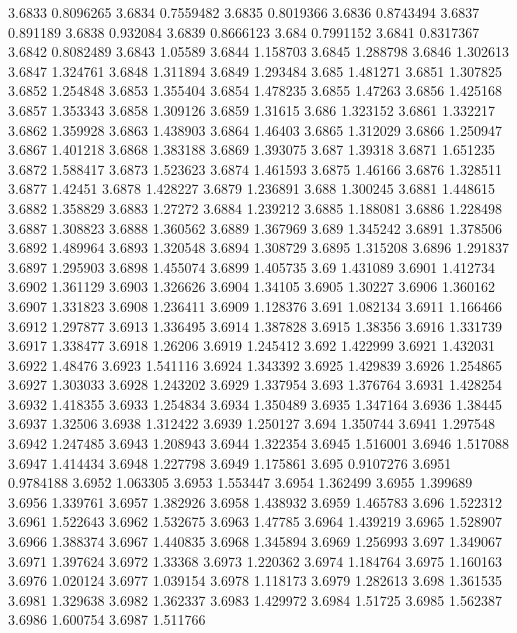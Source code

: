 3.6833  0.8096265
3.6834  0.7559482
3.6835  0.8019366
3.6836  0.8743494
3.6837  0.891189
3.6838  0.932084
3.6839  0.8666123
3.684  0.7991152
3.6841  0.8317367
3.6842  0.8082489
3.6843  1.05589
3.6844  1.158703
3.6845  1.288798
3.6846  1.302613
3.6847  1.324761
3.6848  1.311894
3.6849  1.293484
3.685  1.481271
3.6851  1.307825
3.6852  1.254848
3.6853  1.355404
3.6854  1.478235
3.6855  1.47263
3.6856  1.425168
3.6857  1.353343
3.6858  1.309126
3.6859  1.31615
3.686  1.323152
3.6861  1.332217
3.6862  1.359928
3.6863  1.438903
3.6864  1.46403
3.6865  1.312029
3.6866  1.250947
3.6867  1.401218
3.6868  1.383188
3.6869  1.393075
3.687  1.39318
3.6871  1.651235
3.6872  1.588417
3.6873  1.523623
3.6874  1.461593
3.6875  1.46166
3.6876  1.328511
3.6877  1.42451
3.6878  1.428227
3.6879  1.236891
3.688  1.300245
3.6881  1.448615
3.6882  1.358829
3.6883  1.27272
3.6884  1.239212
3.6885  1.188081
3.6886  1.228498
3.6887  1.308823
3.6888  1.360562
3.6889  1.367969
3.689  1.345242
3.6891  1.378506
3.6892  1.489964
3.6893  1.320548
3.6894  1.308729
3.6895  1.315208
3.6896  1.291837
3.6897  1.295903
3.6898  1.455074
3.6899  1.405735
3.69  1.431089
3.6901  1.412734
3.6902  1.361129
3.6903  1.326626
3.6904  1.34105
3.6905  1.30227
3.6906  1.360162
3.6907  1.331823
3.6908  1.236411
3.6909  1.128376
3.691  1.082134
3.6911  1.166466
3.6912  1.297877
3.6913  1.336495
3.6914  1.387828
3.6915  1.38356
3.6916  1.331739
3.6917  1.338477
3.6918  1.26206
3.6919  1.245412
3.692  1.422999
3.6921  1.432031
3.6922  1.48476
3.6923  1.541116
3.6924  1.343392
3.6925  1.429839
3.6926  1.254865
3.6927  1.303033
3.6928  1.243202
3.6929  1.337954
3.693  1.376764
3.6931  1.428254
3.6932  1.418355
3.6933  1.254834
3.6934  1.350489
3.6935  1.347164
3.6936  1.38445
3.6937  1.32506
3.6938  1.312422
3.6939  1.250127
3.694  1.350744
3.6941  1.297548
3.6942  1.247485
3.6943  1.208943
3.6944  1.322354
3.6945  1.516001
3.6946  1.517088
3.6947  1.414434
3.6948  1.227798
3.6949  1.175861
3.695  0.9107276
3.6951  0.9784188
3.6952  1.063305
3.6953  1.553447
3.6954  1.362499
3.6955  1.399689
3.6956  1.339761
3.6957  1.382926
3.6958  1.438932
3.6959  1.465783
3.696  1.522312
3.6961  1.522643
3.6962  1.532675
3.6963  1.47785
3.6964  1.439219
3.6965  1.528907
3.6966  1.388374
3.6967  1.440835
3.6968  1.345894
3.6969  1.256993
3.697  1.349067
3.6971  1.397624
3.6972  1.33368
3.6973  1.220362
3.6974  1.184764
3.6975  1.160163
3.6976  1.020124
3.6977  1.039154
3.6978  1.118173
3.6979  1.282613
3.698  1.361535
3.6981  1.329638
3.6982  1.362337
3.6983  1.429972
3.6984  1.51725
3.6985  1.562387
3.6986  1.600754
3.6987  1.511766
